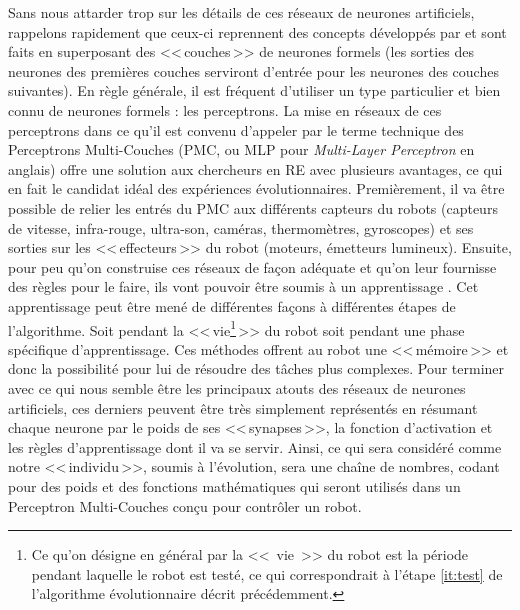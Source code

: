 Sans nous attarder trop sur les détails de ces réseaux de neurones artificiels, rappelons rapidement que ceux-ci reprennent des concepts développés par \citep{mcculloch1943alogicalcideaimmanervacti} et sont faits en superposant des <<\,couches\,>> de neurones formels (les sorties des neurones des premières couches serviront d'entrée pour les neurones des couches suivantes). En règle générale, il est fréquent d'utiliser un type particulier et bien connu de neurones formels : les perceptrons. La mise en réseaux de ces perceptrons dans ce qu'il est convenu d'appeler par le terme technique des Perceptrons Multi-Couches (PMC, ou MLP pour \emph{Multi-Layer Perceptron} en anglais) offre une solution aux chercheurs en RE avec plusieurs avantages, ce qui en fait le candidat idéal des expériences évolutionnaires. Premièrement, il va être possible de relier les entrés du PMC aux différents capteurs du robots (capteurs de vitesse, infra-rouge, ultra-son, caméras, thermomètres, gyroscopes) et ses sorties sur les <<\,effecteurs\,>> du robot (moteurs, émetteurs lumineux). Ensuite, pour peu qu'on construise ces réseaux de façon adéquate et qu'on leur fournisse des règles pour le faire, ils vont pouvoir être soumis à un apprentissage \citep[p. 30-39]{nolfi00evolrobobiolintetechselfmach}. Cet apprentissage peut être mené de différentes façons à différentes étapes de l'algorithme. Soit pendant la <<\,vie\footnote{Ce qu'on désigne en général par la <<~vie~>> du robot est la période pendant laquelle le robot est testé, ce qui correspondrait à l'étape \ref{it:test} de l'algorithme évolutionnaire décrit précédemment.}\,>> du robot soit pendant une phase spécifique d'apprentissage. Ces méthodes offrent au robot une <<\,mémoire\,>> et donc la possibilité pour lui de résoudre des tâches plus complexes. Pour terminer avec ce qui nous semble être les principaux atouts des réseaux de neurones artificiels, ces derniers peuvent être très simplement représentés en résumant chaque neurone par le poids de ses <<\,synapses\,>>, la fonction d'activation et les règles d'apprentissage dont il va se servir. Ainsi, ce qui sera considéré comme notre <<\,individu\,>>, soumis à l'évolution, sera une chaîne de nombres, codant pour des poids et des fonctions mathématiques qui seront utilisés dans un Perceptron Multi-Couches conçu pour contrôler un robot.

